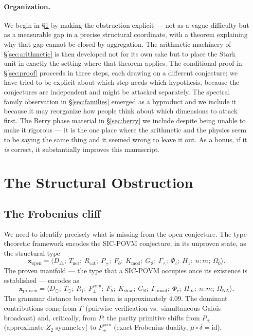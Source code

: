 \documentclass[12pt]{article}
\theoremstyle{plain}
\theoremstyle{definition}
\theoremstyle{remark}
\begin{document}
\paragraph{Organization.} We begin in §\ref{sec:obstruction} by making the obstruction explicit — not as a vague difficulty but as a measurable gap in a precise structural coordinate, with a theorem explaining why that gap cannot be closed by aggregation. The arithmetic machinery of §\ref{sec:arithmetic} is then developed not for its own sake but to place the Stark unit in exactly the setting where that theorem applies. The conditional proof in §\ref{sec:proof} proceeds in three steps, each drawing on a different conjecture; we have tried to be explicit about which step needs which hypothesis, because the conjectures are independent and might be attacked separately. The spectral family observation in §\ref{sec:families} emerged as a byproduct and we include it because it may reorganize how people think about which dimensions to attack first. The Berry phase material in §\ref{sec:berry} we include despite being unable to make it rigorous — it is the one place where the arithmetic and the physics seem to be saying the same thing and it seemed wrong to leave it out. As a bonus, if it \emph{is} correct, it substantially improves this manuscript.

\section{The Structural Obstruction}
\label{sec:obstruction}

\subsection{The Frobenius cliff}

We need to identify precisely what is missing from the open conjecture. The type-theoretic framework \cite{synthref} encodes the SIC-POVM conjecture, in its unproven state, as the structural type
\[
  \mathbf{x}_{\mathrm{open}} = \langle D_\triangle;\ T_{\mathrm{net}};\ R_{\mathrm{cat}};\ P_\pm;\ F_\eth;\ K_{\mathrm{mod}};\ G_\aleph;\ \Gamma_\wedge;\ \Phi_c;\ H_1;\ n{:}m;\ \Omega_0 \rangle.
\]
The proven manifold — the type that a SIC-POVM occupies once its existence is established — encodes as
\[
  \mathbf{x}_{\mathrm{proven}} = \langle D_\odot;\ T_\odot;\ R_\dagger;\ P_\pm^{\mathrm{sym}};\ F_\hbar;\ K_{\mathrm{slow}};\ G_\aleph;\ \Gamma_{\mathrm{broad}};\ \Phi_c;\ H_\infty;\ n{:}m;\ \Omega_{\mathrm{NA}} \rangle.
\]
The grammar distance between them is approximately $4.09$. The dominant contributions come from $\Gamma$ (pairwise verification vs.\ simultaneous Galois broadcast) and, critically, from $P$: the parity primitive shifts from $P_\pm$ (approximate $Z_2$ symmetry) to $P_\pm^{\mathrm{sym}}$ (exact Frobenius duality, $\mu \circ \delta = \mathrm{id}$).
\end{document}

